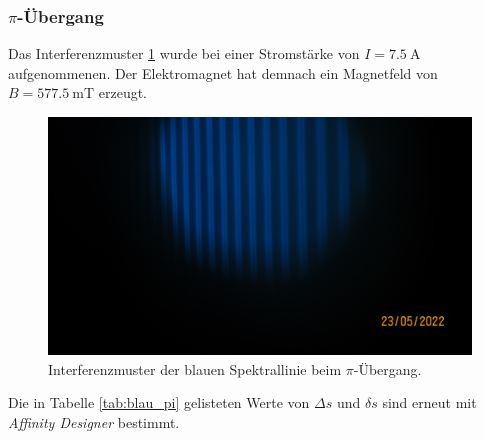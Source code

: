 \subsubsection[]{$\pi$-Übergang}
\label{sec:pi}
Das Interferenzmuster \ref{fig:blau_pi} wurde bei einer Stromstärke von $I=\SI{7.5}{\ampere}$ aufgenommenen. 
Der Elektromagnet hat demnach ein Magnetfeld von $B=\SI{577.5}{\milli\tesla}$ erzeugt. 
\begin{figure}[H]
    \centering
    \includegraphics[scale= 0.2]{Messung/Blau_Pi[5].JPG}
    \caption{Interferenzmuster der blauen Spektrallinie beim $\pi$-Übergang.}
    \label{fig:blau_pi}
\end{figure}
\noindent
Die in Tabelle \ref{tab:blau_pi} gelisteten Werte von $\Delta s$ und $\delta s$ sind erneut mit \textit{Affinity Designer} \cite{affinity}
bestimmt.

